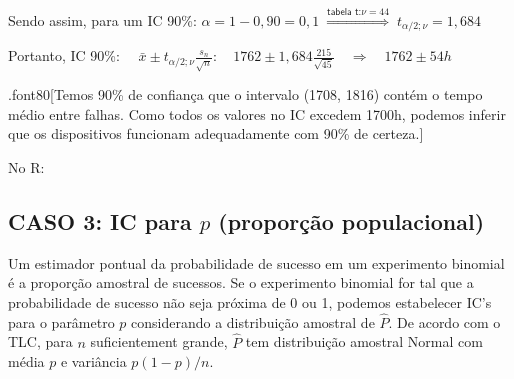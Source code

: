\documentclass[
]{book}
\newenvironment{Shaded}{\begin{snugshade}}{\end{snugshade}}
\newcommand{\CommentTok}[1]{\textcolor[rgb]{0.56,0.35,0.01}{\textit{#1}}}
\newcommand{\DataTypeTok}[1]{\textcolor[rgb]{0.13,0.29,0.53}{#1}}
\newcommand{\DecValTok}[1]{\textcolor[rgb]{0.00,0.00,0.81}{#1}}
\newcommand{\FloatTok}[1]{\textcolor[rgb]{0.00,0.00,0.81}{#1}}
\newcommand{\KeywordTok}[1]{\textcolor[rgb]{0.13,0.29,0.53}{\textbf{#1}}}
\newcommand{\NormalTok}[1]{#1}
\newcommand{\OperatorTok}[1]{\textcolor[rgb]{0.81,0.36,0.00}{\textbf{#1}}}
\newcommand{\StringTok}[1]{\textcolor[rgb]{0.31,0.60,0.02}{#1}}
\theoremstyle{definition}
\theoremstyle{definition}
\theoremstyle{definition}
\theoremstyle{remark}
\begin{document}
Sendo assim, para um IC 90\%:
\(\alpha = 1- 0,90 = 0,1 \; \overset{\textsf{tabela t:}\nu = 44}{\Rightarrow} \; t_{\alpha/2; \nu} = 1,684\)

Portanto,
IC 90\%: \(\quad \bar{x} \pm t_{\alpha/2; \nu} \frac{s_n}{\sqrt{n}}: \quad 1762 \pm 1,684 \frac{215}{\sqrt{45}} \quad \Rightarrow \quad 1762 \pm 54h\)

.font80{[}Temos 90\% de confiança que o intervalo (1708, 1816) contém o tempo médio entre falhas. Como todos os valores no IC excedem 1700h, podemos inferir que os dispositivos funcionam adequadamente com 90\% de certeza.{]}

No R:

\begin{Shaded}
\end{Shaded}

\hypertarget{caso-3-ic-para-p-proporuxe7uxe3o-populacional}{%
\subsection*{\texorpdfstring{CASO 3: IC para \(p\) (proporção populacional)}{CASO 3: IC para p (proporção populacional)}}\label{caso-3-ic-para-p-proporuxe7uxe3o-populacional}}

Um estimador pontual da probabilidade de sucesso em um experimento binomial é a proporção amostral de sucessos. Se o experimento binomial for tal que a probabilidade de sucesso não seja próxima de 0 ou 1, podemos estabelecer IC's para o parâmetro \(p\) considerando a distribuição amostral de \(\hat{P}\). De acordo com o TLC, para \(n\) suficientement grande, \(\hat{P}\) tem distribuição amostral Normal com média \(p\) e variância \(p(1-p)/n\).
\end{document}
